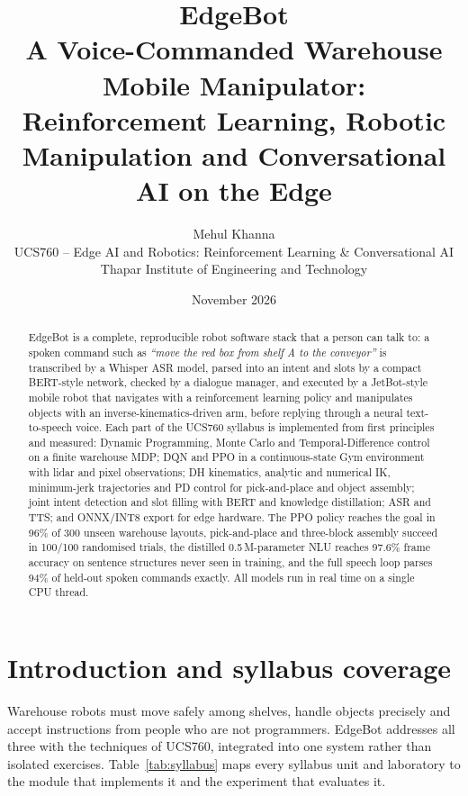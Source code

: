 \documentclass[11pt,a4paper]{article}
\title{\textbf{EdgeBot}\\[4pt]\large A Voice-Commanded Warehouse Mobile Manipulator:\\
Reinforcement Learning, Robotic Manipulation and Conversational AI on the Edge}
\author{Mehul Khanna\\[2pt]
UCS760 -- Edge AI and Robotics: Reinforcement Learning \& Conversational AI\\
Thapar Institute of Engineering and Technology}
\date{November 2026}
\begin{document}
\maketitle

\begin{abstract}
EdgeBot is a complete, reproducible robot software stack that a person can talk to: a spoken
command such as \emph{``move the red box from shelf A to the conveyor''} is transcribed by a
Whisper ASR model, parsed into an intent and slots by a compact BERT-style network, checked by a
dialogue manager, and executed by a JetBot-style mobile robot that navigates with a reinforcement
learning policy and manipulates objects with an inverse-kinematics-driven arm, before replying
through a neural text-to-speech voice. Each part of the UCS760 syllabus is implemented from first
principles and measured: Dynamic Programming, Monte Carlo and Temporal-Difference control on a
finite warehouse MDP; DQN and PPO in a continuous-state Gym environment with lidar and pixel
observations; DH kinematics, analytic and numerical IK, minimum-jerk trajectories and PD control for
pick-and-place and object assembly; joint intent detection and slot filling with BERT and knowledge
distillation; ASR and TTS; and ONNX/INT8 export for edge hardware. The PPO policy reaches the goal in
96\% of 300 unseen warehouse layouts, pick-and-place and three-block assembly succeed in 100/100
randomised trials, the distilled 0.5\,M-parameter NLU reaches 97.6\% frame accuracy on
sentence structures never seen in training, and the full speech loop parses 94\% of held-out spoken
commands exactly. All models run in real time on a single CPU thread.
\end{abstract}

\tableofcontents
\newpage

\section{Introduction and syllabus coverage}
Warehouse robots must move safely among shelves, handle objects precisely and accept
instructions from people who are not programmers. EdgeBot addresses all three with the techniques of
UCS760, integrated into one system rather than isolated exercises. Table~\ref{tab:syllabus} maps every
syllabus unit and laboratory to the module that implements it and the experiment that evaluates it.
\end{document}
